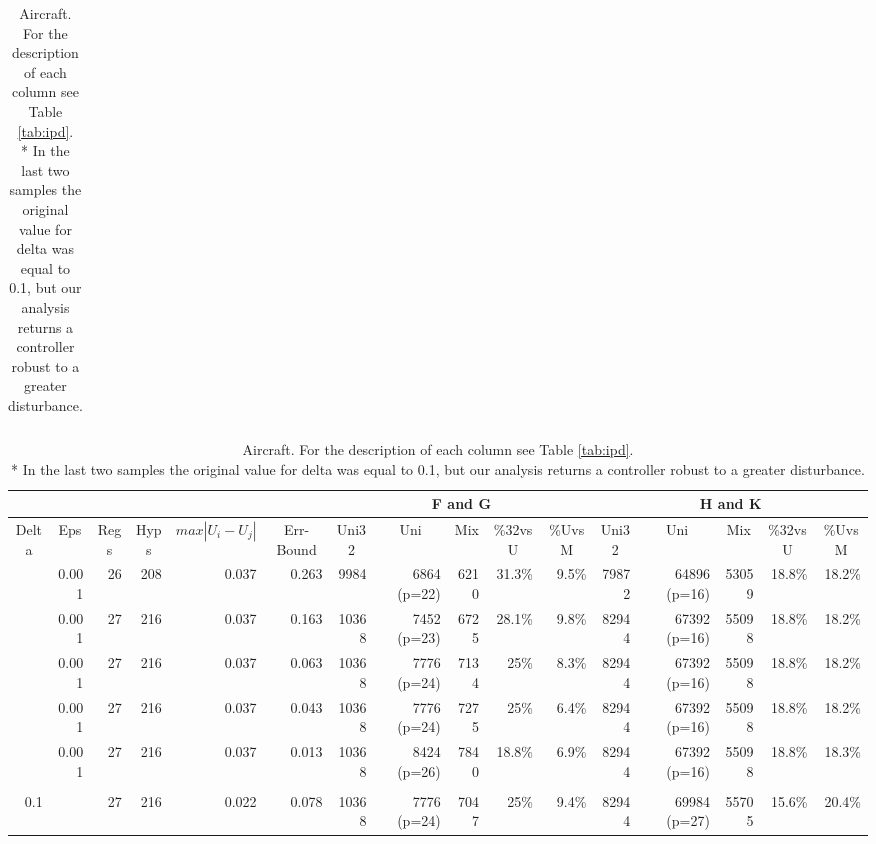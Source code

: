 \begin{landscape}
\begin{table}[p]
\begin{tabular}{rrrrrrrrrrrrrrrr}
	\end{tabular}
	\vspace*{1 cm}
	\centering
	\caption{Aircraft. For the description of each column see Table \ref{tab:ipd}.\\
	* In the last two samples the original value for delta was equal to 0.1, but our analysis returns a controller robust to a greater disturbance.}
	\label{tab:aircraft}
	\begin{tabular}{rrrrrrrrrrrrrrrr}
		\cline{7-11}
		\cline{12-16}
		\multicolumn{4}{c}{} &
		\multicolumn{2}{c}{} &
		\multicolumn{5}{c|}{F and G} &
		\multicolumn{5}{c}{H and K} \\
		\hline
		\multicolumn{1}{c}{Delta}&
		\multicolumn{1}{c}{Eps} &
		\multicolumn{1}{c}{Regs} &
		\multicolumn{1}{c}{Hyps} &
		\multicolumn{1}{c}{$max|U_{i}-U_{j}|$} &
		\multicolumn{1}{c}{Err-Bound} &
		\multicolumn{1}{c}{Uni32}&
		\multicolumn{1}{c}{Uni}&
		\multicolumn{1}{c}{Mix}&
		\multicolumn{1}{c}{\%32vsU}&
		\multicolumn{1}{c}{\%UvsM}&
		\multicolumn{1}{c}{Uni32}&
		\multicolumn{1}{c}{Uni}&
		\multicolumn{1}{c}{Mix}&
		\multicolumn{1}{c}{\%32vsU}&
		\multicolumn{1}{c}{\%UvsM} \\
		\hline
		
		\color{red}{0.30} & 0.001 & 26 & 208 & 0.037 & 0.263 & 9984 & 6864 (p=22) & 6210 & 31.3\% & 9.5\% & 79872 & 64896 (p=16) & 53059 & 18.8\% & 18.2\% \\
		
		\color{red}{0.20} & 0.001 & 27 & 216 & 0.037 & 0.163 & 10368 & 7452 (p=23) & 6725 & 28.1\% & 9.8\% & 82944 & 67392 (p=16) & 55098 & 18.8\% & 18.2\% \\
		
		\color{red}{0.10} & 0.001 & 27 & 216 & 0.037 & 0.063 & 10368 & 7776 (p=24) & 7134 & 25\% & 8.3\% & 82944 & 67392 (p=16) & 55098 & 18.8\% & 18.2\% \\
		
		\color{red}{0.08} & 0.001 & 27 & 216 & 0.037 & 0.043 & 10368 & 7776 (p=24) & 7275 & 25\% & 6.4\% & 82944 & 67392 (p=16) & 55098 & 18.8\% & 18.2\% \\
		
		\color{red}{0.05} & 0.001 & 27 & 216 & 0.037 & 0.013 & 10368 & 8424 (p=26) & 7840 & 18.8\% & 6.9\% & 82944 & 67392 (p=16) & 55098 & 18.8\% & 18.3\% \\\\
		
		
		0.1 & \color{red}{0.0006} & 27 & 216 & 0.022 & 0.078 & 10368 & 7776 (p=24) & 7047 & 25\% & 9.4\% & 82944 & 69984 (p=27) & 55705 & 15.6\% & 20.4\% \\
		

\end{tabular}
\end{table}
\end{landscape}
